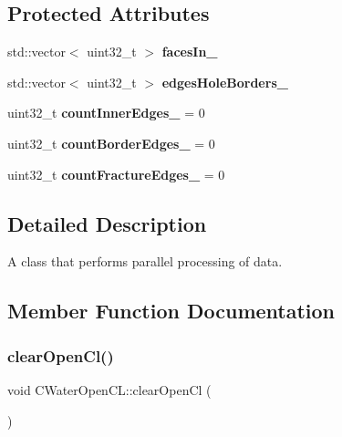 \subsection*{Protected Attributes}
\begin{DoxyCompactItemize}
\item 
\mbox{\label{class_c_water_open_c_l_ac737018fb1ad601bdb27e916bcba2dc9}} 
std\+::vector$<$ uint32\+\_\+t $>$ {\bfseries faces\+In\+\_\+}
\item 
\mbox{\label{class_c_water_open_c_l_ac77a547983236889023df42587eb5576}} 
std\+::vector$<$ uint32\+\_\+t $>$ {\bfseries edges\+Hole\+Borders\+\_\+}
\item 
\mbox{\label{class_c_water_open_c_l_ac8ddc30747be7685da174f20d33976f2}} 
uint32\+\_\+t {\bfseries count\+Inner\+Edges\+\_\+} = 0
\item 
\mbox{\label{class_c_water_open_c_l_a762f011180770ef178b923bd3afebb98}} 
uint32\+\_\+t {\bfseries count\+Border\+Edges\+\_\+} = 0
\item 
\mbox{\label{class_c_water_open_c_l_a70cf05f1d4d723bc90d671fcf9c6ed85}} 
uint32\+\_\+t {\bfseries count\+Fracture\+Edges\+\_\+} = 0
\end{DoxyCompactItemize}


\subsection{Detailed Description}
A class that performs parallel processing of data. 

\subsection{Member Function Documentation}
\mbox{\label{class_c_water_open_c_l_a213bd842a23c3a1d50e90b60d9395143}} 
\subsubsection{\texorpdfstring{clear\+Open\+Cl()}{clearOpenCl()}}
{\footnotesize\ttfamily void C\+Water\+Open\+C\+L\+::clear\+Open\+Cl (\begin{DoxyParamCaption}{ }\end{DoxyParamCaption})\hspace{0.3cm}{\ttfamily [protected]}}

